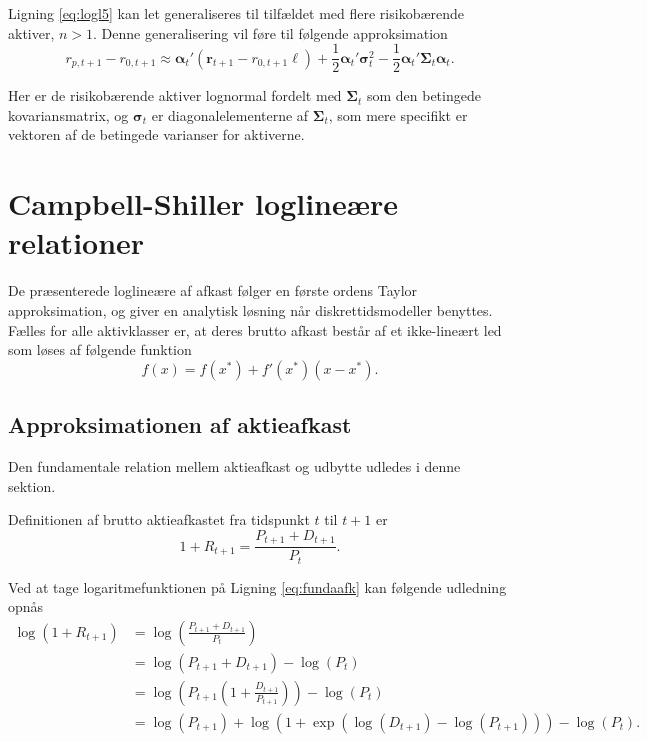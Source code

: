 \documentclass[
  a4paper,
  oneside]{memoir}
\begin{document}
Ligning \eqref{eq:logl5} kan let generaliseres til tilfældet med flere risikobærende aktiver, \(n>1\). Denne generalisering vil føre til følgende approksimation
\begin{equation}
r_{p,t+1} - r_{0,t+1} \approx \bm{\alpha}_t'(\bm{r}_{t+1} - r_{0,t+1}\bm{\ell}) + \frac{1}{2} \bm{\alpha}_t'\bm{\sigma}_t^2 - \frac{1}{2}\bm{\alpha}_t'\bm{\Sigma}_t\bm{\alpha}_t. \label{eq:logl6}
\end{equation}

Her er de risikobærende aktiver lognormal fordelt med \(\bm{\Sigma}_t\) som den betingede kovariansmatrix, og \(\bm{\sigma}_t\) er diagonalelementerne af \(\bm{\Sigma}_t\), som mere specifikt er vektoren af de betingede varianser for aktiverne.

\hypertarget{campbell-shiller-loglineuxe6re-relationer}{%
\chapter{Campbell-Shiller loglineære relationer}\label{campbell-shiller-loglineuxe6re-relationer}}

De præsenterede loglineære af afkast følger en første ordens Taylor approksimation, og giver en analytisk løsning når diskrettidsmodeller benyttes. Fælles for alle aktivklasser er, at deres brutto afkast består af et ikke-lineært led som løses af følgende funktion
\[f(x)=f(x^*)+f'(x^*)(x-x^*).\]

\hypertarget{approksimationen-af-aktieafkast}{%
\section{Approksimationen af aktieafkast}\label{approksimationen-af-aktieafkast}}

Den fundamentale relation mellem aktieafkast og udbytte udledes i denne sektion.

Definitionen af brutto aktieafkastet fra tidspunkt \(t\) til \(t+1\) er
\begin{equation}
1+R_{t+1}=\frac{P_{t+1}+D_{t+1}}{P_t}. \label{eq:fundaafk}
\end{equation}

Ved at tage logaritmefunktionen på Ligning \eqref{eq:fundaafk} kan følgende udledning opnås
\begin{align*}
\log\left(1+R_{t+1}\right)&=\log\left(\frac{P_{t+1}+D_{t+1}}{P_t}\right)\\
&=\log\left(P_{t+1}+D_{t+1}\right)-\log\left(P_t\right)\\
&=\log\left(P_{t+1}\left(1+\frac{D_{t+1}}{P_{t+1}}\right)\right)-\log\left(P_t\right)\\
&=\log\left(P_{t+1}\right)+\log\left(1+\exp\left(\log\left(D_{t+1}\right)-\log\left(P_{t+1}\right)\right)\right)-\log\left(P_t\right).
\end{align*}
\end{document}
